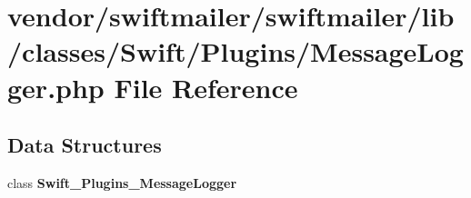 \section{vendor/swiftmailer/swiftmailer/lib/classes/\+Swift/\+Plugins/\+Message\+Logger.php File Reference}
\label{_message_logger_8php}
\subsection*{Data Structures}
\begin{DoxyCompactItemize}
\item 
class {\bf Swift\+\_\+\+Plugins\+\_\+\+Message\+Logger}
\end{DoxyCompactItemize}

